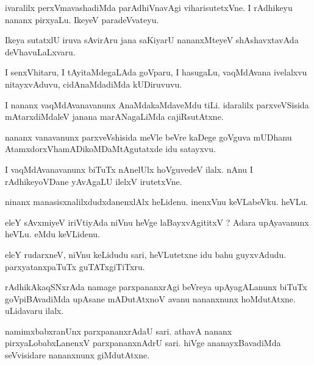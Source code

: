\documentclass{article}
\begin{document}
\begin{mn}%
ivaralilx perxVmavashadiMda parAdhiVnavAgi viharisutetxVne. I rAdhikeyu nananx pirxyaLu. 
IkeyeV paradeVvateyu.
\end{mn}

\begin{mn}%
Ikeya sutatxlU iruva sAvirAru jana saKiyarU nananxMteyeV shAshavxtavAda deVhavuLaLxvaru.
\end{mn}

\begin{mn}%
I senxVhitaru, I tAyitaMdegaLAda goVparu, I hasugaLu, vaqMdAvana ivelalxvu nitayxvAduvu, 
cidAnaMdadiMda kUDiruvuvu.
\end{mn}

\begin{mn}%
I nananx vaqMdAvanavanunx AnaMdakaMdaveMdu tiLi. idaralilx parxveVSisida  mAtarxdiMdaleV 
janana marANagaLiMda cajiRsutAtxne.
\end{mn}

\begin{mn}%
nananx vanavanunx parxveVshisida meVle beVre kaDege goVguva mUDhanu 
AtamxdorxVhamADikoMDaMtAgutatxde idu satayxvu.
\end{mn}

\begin{mn}%
I vaqMdAvanavanunx biTuTx nAnelUlx hoVguvedeV ilalx. nAnu I rAdhikeyoVDane yAvAgaLU ilelxV 
irutetxVne.
\end{mn}

\begin{mn}%
ninanx manasisxnalilxdudxdanenxlAlx heLidenu. inenxVnu keVLabeVku. heVLu.
\end{mn}

\begin{mn}%
eleY sAvxmiyeV iriVtiyAda niVnu heVge laBayxvAgititxV ? Adara upAyavanunx heVLu. eMdu 
keVLidenu.
\end{mn}

\begin{mn}%
eleY rudarxneV, niVnu keLidudu sari, heVLutetxne idu bahu guyxvAdudu. parxyatanxpaTuTx 
guTATxgiTiTxru.
\end{mn}

\begin{mn}%
rAdhikAkaqSNxrAda namage parxpananxrAgi beVreya upAyagALanunx biTuTx goVpiBAvadiMda 
upAsane mADutAtxnoV avanu nananxnunx hoMdutAtxne. uLidavaru ilalx.
\end{mn}

\begin{mn}%
namimxbabxranUnx parxpananxrAdaU sari. athavA nananx pirxyaLobabxLanenxV parxpananxnAdrU 
sari. hiVge ananayxBavadiMda seVvisidare nananxnunx giMdutAtxne.
\end{mn}
\end{document}
